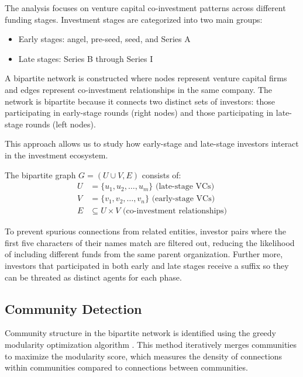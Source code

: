 \documentclass[12pt]{article}
\begin{document}
The analysis focuses on venture capital co-investment patterns across different funding stages. Investment stages are categorized into two main groups:
\begin{itemize}
    \item Early stages: angel, pre-seed, seed, and Series A
    \item Late stages: Series B through Series I
\end{itemize}

A bipartite network is constructed where nodes represent venture capital firms and edges represent co-investment relationships in the same company. The network is bipartite because it connects two distinct sets of investors: those participating in early-stage rounds (right nodes) and those participating in late-stage rounds (left nodes).

This approach allows us to study how early-stage and late-stage investors interact in the investment ecosystem.

The bipartite graph $G = (U \cup V, E)$ consists of:
\begin{align}
U &= \{u_1, u_2, \ldots, u_m\} \text{ (late-stage VCs)} \\
V &= \{v_1, v_2, \ldots, v_n\} \text{ (early-stage VCs)} \\
E &\subseteq U \times V \text{ (co-investment relationships)}
\end{align}

To prevent spurious connections from related entities, investor pairs where the first five characters of their names match are filtered out, reducing the likelihood of including different funds from the same parent organization. Further more,  investors that participated in both early and late stages receive a suffix so they can be threated as distinct agents for each phase.



\subsection{Community Detection}

Community structure in the bipartite network is identified using the greedy modularity optimization algorithm \cite{Borgatti2011}. This method iteratively merges communities to maximize the modularity score, which measures the density of connections within communities compared to connections between communities.
\end{document}
